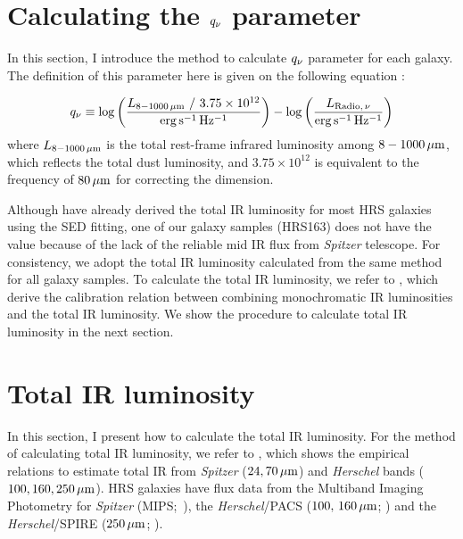 \section{Calculating the $q_{\nu}$ parameter}\label{subsec:calculatingq}
In this section, I introduce the method to calculate $q_{\nu}$ parameter for each galaxy.
The definition of this parameter here is given on the following equation \citep[e.g.][]{Helou1985, Bell2003, CalistroRivera2017a}:

\begin{equation}\label{eq:q_def}
    q_{\nu} \equiv \log\left(\frac{L_{\mathrm{8-1000\,\mu m}}\ /\ 3.75 \times 10^{12}}{{\rm erg\,s^{-1}\,Hz^{-1}}}\right) - \log\left(\frac{L_{\mathrm{Radio},\,\nu}}{{\rm erg\,s^{-1}\,Hz^{-1}}}\right)
\end{equation}
where $L_{\mathrm{8-1000\,\mu m}}$ is the total rest-frame infrared luminosity among $8 - 1000\,\mathrm{\mu m}$, which reflects the total dust luminosity, and $3.75\times10^{12}$ is equivalent to the frequency of $80\,\mathrm{\mu m}$ for correcting the dimension.

Although \citet{Ciesla2014} have already derived the total IR luminosity for most HRS galaxies using the SED fitting, one of our galaxy samples (HRS163) does not have the value because of the lack of the reliable mid IR flux from {\it Spitzer\/} telescope.
For consistency, we adopt the total IR luminosity calculated from the same method for all galaxy samples.
To calculate the total IR luminosity, we refer to \citet{Galametz2013}, which derive the calibration relation between combining monochromatic IR luminosities and the total IR luminosity.
We show the procedure to calculate total IR luminosity in the next section.



\section{Total IR luminosity}\label{sec:tirluminosity}
In this section, I present how to calculate the total IR luminosity.
For the method of calculating total IR luminosity, we refer to \citet{Galametz2013}, which shows the empirical relations to estimate total IR from {\it Spitzer\/} ($24, 70\,\mathrm{\mu m}$) and {\it Herschel\/} bands ($100, 160, 250\,\mathrm{\mu m}$).
HRS galaxies have flux data from the Multiband Imaging Photometry for {\it Spitzer\/} (MIPS;~\citealt{Rieke2004, Bendo2012}), the {\it Herschel\/}/PACS ($100,\,160\,\mathrm{\mu m}$; \citealt{Cortese2014c}) and the {\it Herschel\/}/SPIRE ($250\,\mathrm{\mu m}$; \citealt{Ciesla2012a}).

